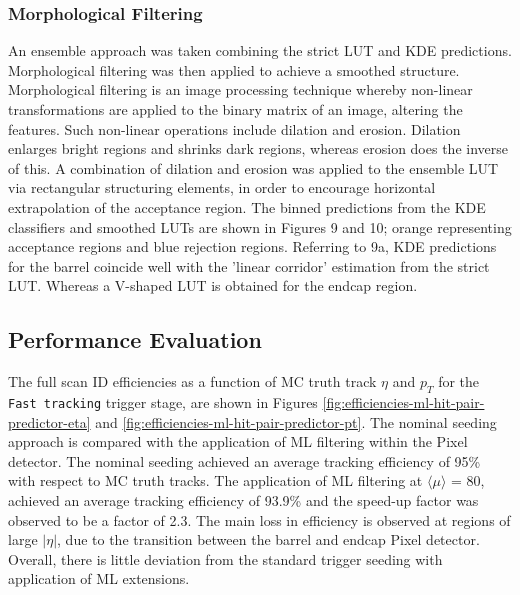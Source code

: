 \subsubsection{Morphological Filtering}


An ensemble approach was taken combining the strict LUT and KDE predictions. Morphological filtering was then applied to achieve a smoothed structure. Morphological filtering is an image processing technique whereby non-linear transformations are applied to the binary matrix of an image, altering the features. Such non-linear operations include dilation and erosion. Dilation enlarges bright regions and shrinks dark regions, whereas erosion does the inverse of this. A combination of dilation and erosion was applied to the ensemble LUT via rectangular structuring elements, in order to encourage horizontal
extrapolation of the acceptance region. The binned predictions from the KDE classifiers and smoothed LUTs are shown in Figures 9 and 10; orange representing acceptance regions and blue rejection regions.
Referring to 9a, KDE predictions for the barrel coincide well with the ’linear corridor’ estimation from the strict LUT. Whereas a V-shaped LUT is obtained for the endcap region.





\subsection{Performance Evaluation}

The full scan ID efficiencies as a function of MC truth track $\eta$ and $p_T$ for the \texttt{Fast tracking} trigger stage, are shown in Figures \ref{fig:efficiencies-ml-hit-pair-predictor-eta} and \ref{fig:efficiencies-ml-hit-pair-predictor-pt}. The nominal seeding approach is compared with the application of ML filtering within the Pixel detector. The nominal seeding achieved an average tracking efficiency of 95\% with respect to MC truth tracks. The application of ML filtering at $\langle \mu \rangle$ = 80, achieved an average tracking efficiency of 93.9\% and the speed-up factor was observed to be a factor of 2.3. The main loss in efficiency is observed at regions of large $\lvert \eta \rvert$, due to the transition between the barrel and endcap Pixel detector. Overall, there is little deviation from the standard trigger seeding with application of ML extensions.


